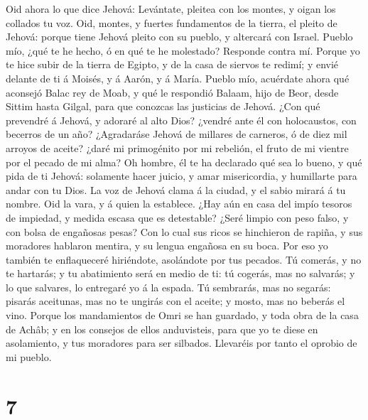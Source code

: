  Oid ahora lo que dice Jehová: Levántate, pleitea con los
montes, y oigan los collados tu voz.  Oid, montes, y
fuertes fundamentos de la tierra, el pleito de Jehová: porque tiene
Jehová pleito con su pueblo, y altercará con Israel. 
Pueblo mío, ¿qué te he hecho, ó en qué te he molestado? Responde contra
mí.  Porque yo te hice subir de la tierra de Egipto, y de
la casa de siervos te redimí; y envié delante de ti á Moisés, y á Aarón,
y á María.  Pueblo mío, acuérdate ahora qué aconsejó Balac
rey de Moab, y qué le respondió Balaam, hijo de Beor, desde Sittim hasta
Gilgal, para que conozcas las justicias de Jehová.  ¿Con
qué prevendré á Jehová, y adoraré al alto Dios? ¿vendré ante él con
holocaustos, con becerros de un año?  ¿Agradaráse Jehová
de millares de carneros, ó de diez mil arroyos de aceite? ¿daré mi
primogénito por mi rebelión, el fruto de mi vientre por el pecado de mi
alma?  Oh hombre, él te ha declarado qué sea lo bueno, y
qué pida de ti Jehová: solamente hacer juicio, y amar misericordia, y
humillarte para andar con tu Dios.  La voz de Jehová clama
á la ciudad, y el sabio mirará á tu nombre. Oid la vara, y á quien la
establece.  ¿Hay aún en casa del impío tesoros de
impiedad, y medida escasa que es detestable?  ¿Seré
limpio con peso falso, y con bolsa de engañosas pesas? 
Con lo cual sus ricos se hinchieron de rapiña, y sus moradores hablaron
mentira, y su lengua engañosa en su boca.  Por eso yo
también te enflaqueceré hiriéndote, asolándote por tus pecados.
 Tú comerás, y no te hartarás; y tu abatimiento será en
medio de ti: tú cogerás, mas no salvarás; y lo que salvares, lo
entregaré yo á la espada.  Tú sembrarás, mas no segarás:
pisarás aceitunas, mas no te ungirás con el aceite; y mosto, mas no
beberás el vino.  Porque los mandamientos de Omri se han
guardado, y toda obra de la casa de Achâb; y en los consejos de ellos
anduvisteis, para que yo te diese en asolamiento, y tus moradores para
ser silbados. Llevaréis por tanto el oprobio de mi pueblo.

\hypertarget{section-6}{%
\section{7}\label{section-6}}


